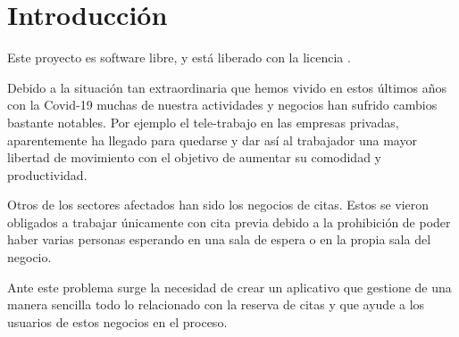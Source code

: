 \chapter{Introducción}

Este proyecto es software libre, y está liberado con la licencia \cite{gplv3}.

Debido a la situación tan extraordinaria que hemos vivido en estos últimos años con la Covid-19
muchas de nuestra actividades y negocios han sufrido cambios bastante notables.
Por ejemplo el tele-trabajo en las empresas privadas, aparentemente ha llegado para
quedarse y dar así al trabajador una mayor libertad de movimiento con el objetivo de
aumentar su comodidad y productividad.

Otros de los sectores afectados han sido los negocios de citas. Estos se vieron obligados
a trabajar únicamente con cita previa debido a la prohibición de poder haber varias personas
esperando en una sala de espera o en la propia sala del negocio.

Ante este problema surge la necesidad de crear un aplicativo que gestione de una manera
sencilla todo lo relacionado con la reserva de citas y que ayude a los usuarios de estos negocios en el proceso.